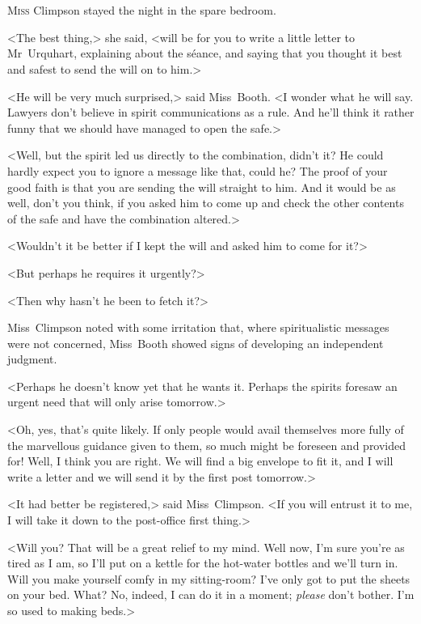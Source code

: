 \chapter[Chapter \thechapter]{}
\lettrine{M}{iss} Climpson stayed the night in the spare bedroom.

\zz
<The best thing,> she said, <will be for you to write a little letter to Mr~Urquhart, explaining about the séance, and saying that you thought it best and safest to send the will on to him.>

<He will be very much surprised,> said Miss~Booth. <I wonder what he will say. Lawyers don't believe in spirit communications as a rule. And he'll think it rather funny that we should have managed to open the safe.>

<Well, but the spirit led us directly to the combination, didn't it? He could hardly expect you to ignore a message like that, could he? The proof of your good faith is that you are sending the will straight to him. And it would be as well, don't you think, if you asked him to come up and check the other contents of the safe and have the combination altered.>

<Wouldn't it be better if I kept the will and asked him to come for it?>

<But perhaps he requires it urgently?>

<Then why hasn't he been to fetch it?>

Miss~Climpson noted with some irritation that, where spiritualistic messages were not concerned, Miss~Booth showed signs of developing an independent judgment.

<Perhaps he doesn't know yet that he wants it. Perhaps the spirits foresaw an urgent need that will only arise tomorrow.>

<Oh, yes, that's quite likely. If only people would avail themselves more fully of the marvellous guidance given to them, so much might be foreseen and provided for! Well, I think you are right. We will find a big envelope to fit it, and I will write a letter and we will send it by the first post tomorrow.>

<It had better be registered,> said Miss~Climpson. <If you will entrust it to me, I will take it down to the post-office first thing.>

<Will you? That will be a great relief to my mind. Well now, I'm sure you're as tired as I am, so I'll put on a kettle for the hot-water bottles and we'll turn in. Will you make yourself comfy in my sitting-room? I've only got to put the sheets on your bed. What? No, indeed, I can do it in a moment; \emph{please} don't bother. I'm so used to making beds.>

